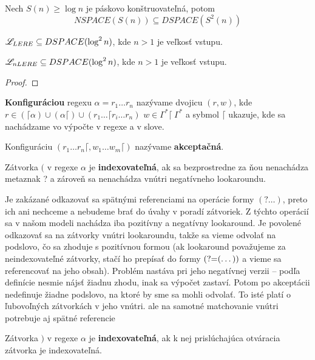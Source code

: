 \begin{veta}[Savitch]
Nech $S(n)\geq \log n$ je páskovo konštruovateľná, potom 
$$ NSPACE(S(n)) \subseteq DSPACE(S^2(n)) $$
\end{veta}

\begin{dosledok}
$\mathscr{L}_{LERE} \subseteq DSPACE(\log^2 n)$, kde $n>1$ je veľkosť vstupu.
\end{dosledok}

\begin{veta}
$\mathscr{L}_{nLERE} \subseteq DSPACE(\log^2 n)$, kde $n>1$ je veľkosť vstupu.
\end{veta}
\begin{proof}
\TODO
\end{proof}

\begin{df}
\textbf{Konfiguráciou} regexu $\alpha = r_1 \dots r_n$ nazývame dvojicu $(r, w)$, kde $r \in (\lceil\alpha)\cup(\alpha\lceil)\cup(r_1 \dots \lceil r_i \dots r_n)$ $w \in \Gamma^*\lceil~ \Gamma^*$ a sybmol $\lceil$ ukazuje, kde sa nachádzame vo výpočte v regexe a v slove.
\end{df}

\begin{df}
Konfiguráciu $(r_1 \dots r_n \lceil, w_1\dots w_m \lceil)$ nazývame \textbf{akceptačná}.
\end{df}

\begin{df}
Zátvorka $($ v regexe $\alpha$ je \textbf{indexovateľná}, ak sa bezprostredne za ňou nenachádza metaznak ? a zároveň sa nenachádza vnútri negatívneho lookaroundu.
\end{df}
Je zakázané odkazovať sa spätnými referenciami na operácie formy $(?\dots )$, preto ich ani nechceme a nebudeme brať do úvahy v poradí zátvoriek. Z týchto operácií sa v našom modeli nachádza iba pozitívny a negatívny lookaround. Je povolené odkazovať sa na zátvorky vnútri lookaroundu, takže sa vieme odvolať na podslovo, čo sa zhoduje s pozitívnou formou (ak lookaround považujeme za neindexovateľné zátvorky, stačí ho prepísať do formy $\text{(?=} (\dots ))$ a vieme sa referencovať na jeho obsah). Problém nastáva pri jeho negatívnej verzii -- podľa definície nesmie nájsť žiadnu zhodu, inak sa výpočet zastaví. Potom po akceptácii nedefinuje žiadne podslovo, na ktoré by sme sa mohli odvolať. To isté platí o ľubovoľných zátvorkách v jeho vnútri.
\TODO ale na samotné matchovanie vnútri potrebuje aj spätné referencie

\begin{df}
Zátvorka $)$ v regexe $\alpha$ je \textbf{indexovateľná}, ak k nej prislúchajúca otváracia zátvorka je indexovateľná.
\end{df}

